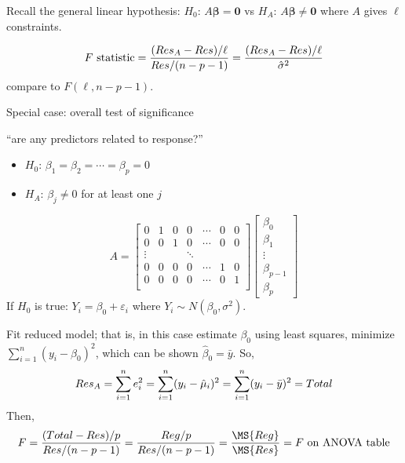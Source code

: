 Recall the general linear hypothesis:
$ H_0 $: $ A\symbf{\beta}=\symbf{0} $
vs $ H_A $: $ A\symbf{\beta}\neq \symbf{0} $
where $ A $ gives $ \ell $ constraints.

\[ F\text{ statistic}=
    \frac{(\relax{Res}_A-\relax{Res})/\ell}{\relax{Res}/(n-p-1)}=
    \frac{(\relax{Res}_A-\relax{Res})/\ell}{\hat{\sigma}^2}  \]
compare to $ F(\ell,n-p-1) $.

Special case: overall test of significance

``are any predictors related to response?''
\begin{itemize}
    \item $ H_0 $: $ \beta_1=\beta_2=\cdots=\beta_p=0 $
    \item $ H_A $: $ \beta_j\neq 0 $ for at least one $ j $
\end{itemize}
\[ A=\begin{bmatrix}
        0      & 1 & 0 & 0      & \cdots & 0 & 0 \\
        0      & 0 & 1 & 0      & \cdots & 0 & 0 \\
        \vdots &   &   & \ddots                  \\
        0      & 0 & 0 & 0      & \cdots & 1 & 0 \\
        0      & 0 & 0 & 0      & \cdots & 0 & 1 \\
    \end{bmatrix}\begin{bmatrix}
        \beta_0     \\
        \beta_1     \\
        \vdots      \\
        \beta_{p-1} \\
        \beta_p
    \end{bmatrix} \]
If $ H_0 $ is true: $ Y_i=\beta_0+\varepsilon_i $
where $ Y_i \sim N(\beta_0,\sigma^2) $.

Fit reduced model; that is, in this case estimate $ \beta_0 $
using least squares, minimize $ \sum_{i=1}^{n} (y_i-\beta_0)^2 $,
which can be shown $ \hat{\beta}_0=\bar{y} $. So,
\[ \relax{Res}_A
    =\sum_{i=1}^{n} e_i^2
    =\sum_{i=1}^{n} (y_i-\hat{\mu}_i)^2
    =\sum_{i=1}^{n}(y_i-\bar{y})^2
    =\relax{Total} \]
Then,
\[ F=\frac{(\SS{Total}-\SS{Res})/p}{\SS{Res}/(n-p-1)}
    =\frac{\SS{Reg}/p}{\SS{Res}/(n-p-1)}
    =\frac{\MS{Reg}}{\MS{Res}}
    =F\text{ on ANOVA table}    \]
